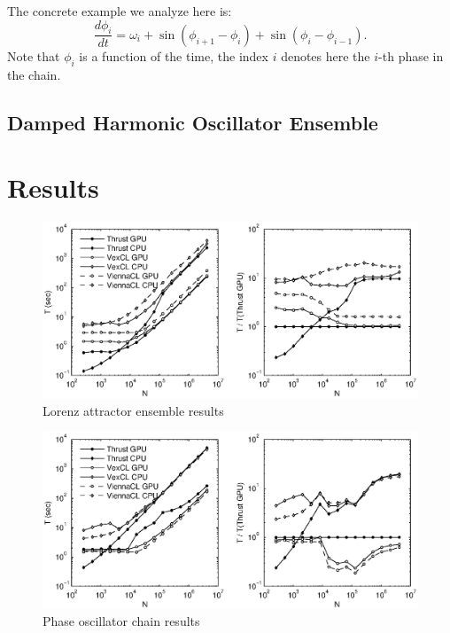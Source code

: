 \documentclass[1p]{elsarticle}
\begin{document}
The concrete example we analyze here is:
\begin{equation}
    \frac{d\phi_i}{dt} = \omega_i + \sin( \phi_{i+1} - \phi_i) + \sin( \phi_i
    - \phi_{i-1}).
\end{equation}
Note that $\phi_i$ is a function of the time, the index $i$ denotes here the
$i$-th phase in the chain.

\subsection{Damped Harmonic Oscillator Ensemble}

\section{Results}

\begin{figure}
    \begin{center}
	\includegraphics[width=\textwidth]{data/lorenz_ensemble/perfcmp}
    \end{center}
    \caption{Lorenz attractor ensemble results}
    \label{fig:lorenz:perf}
\end{figure}

\begin{figure}
    \begin{center}
	\includegraphics[width=\textwidth]{data/phase_oscillator_chain/perfcmp}
    \end{center}
    \caption{Phase oscillator chain results}
    \label{fig:phase:perf}
\end{figure}
\end{document}
